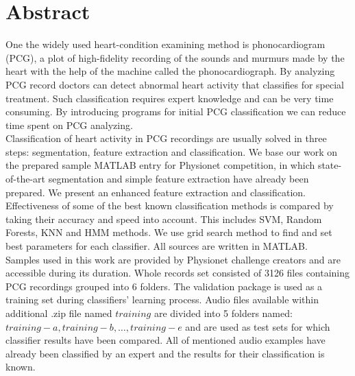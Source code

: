 \documentclass[10pt,a4paper]{article}
\begin{document}
\section{Abstract}
One the widely used heart-condition examining method is phonocardiogram (PCG), a plot of high-fidelity recording of the sounds and murmurs made by the heart with the help of the machine called the phonocardiograph. By analyzing PCG record doctors can detect abnormal heart activity that classifies for special treatment. Such classification requires expert knowledge and can be very time consuming. By introducing programs for initial PCG classification we can reduce time spent on PCG analyzing. \\

Classification of heart activity in PCG recordings are usually solved in three steps: segmentation, feature extraction and classification. We base our work on the prepared sample MATLAB entry for Physionet competition, in which state-of-the-art segmentation and simple feature extraction have already been prepared. We present an enhanced feature extraction and classification. Effectiveness of some of the best known classification methods is compared by taking their accuracy and speed into account. This includes SVM, Random Forests, KNN and HMM methods. We use grid search method to find and set best parameters for each classifier. All sources are written in MATLAB. \\

Samples used in this work are provided by Physionet challenge creators and are accessible during its duration. Whole records set consisted of 3126 files containing PCG recordings grouped into 6 folders. The validation package is used as a training set during classifiers' learning process. Audio files available within additional .zip file named $training$ are divided into 5 folders named: $training-a, training-b, \dots, training-e$ and are used as test sets for which classifier results have been compared. All of mentioned audio examples have already been classified by an expert and the results for their classification is known.
\end{document}
